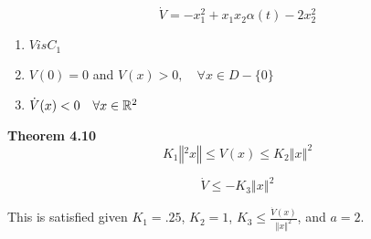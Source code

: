 $$
\dot{V}=-x_{1}^{2}+x_{1} x_{2} \alpha(t)-2 x_{2}^{2}
$$


\begin{enumerate}
  \item $V is C_1$
  \item $V(0)= 0 $ and $V(x) > 0, \quad \forall x \in D - \{ 0\}$
  \item $\dot{V}(x) < 0 \quad \forall x \in \mathbb{R}^2$
\end{enumerate}

\noindent \textbf{Theorem 4.10}
$$
K_1 \left\Vert^2 x \right\Vert \leq V(x) \leq K_2 \left\Vert x \right\Vert^2
$$


$$
\dot{V} \leq -K_3 \left\Vert x \right\Vert^2
$$


\noindent This is satisfied given $K_1 = .25$, $K_2 =1 $, $K_3\leq \frac{\dot{V}(x)}{\left\Vert x\right\Vert^2}$, and $a =2$.
